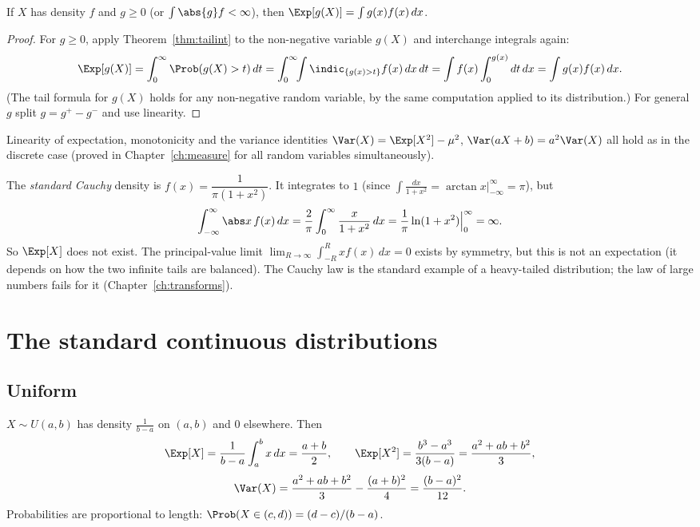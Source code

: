 \begin{theorem}\label{thm:lotuscont}
If $X$ has density $f$ and $g\ge0$ (or $\int\abs{g}f<\infty$), then
$\Exp[g(X)]=\int g(x)f(x)\,dx$.
\end{theorem}
\begin{proof}
For $g\ge0$, apply Theorem~\ref{thm:tailint} to the non-negative variable
$g(X)$ and interchange integrals again:
\[
\Exp[g(X)]=\int_0^\infty\Prob(g(X)>t)\,dt=\int_0^\infty\!\!\int\indic_{\{g(x)>t\}}f(x)\,dx\,dt
=\int f(x)\int_0^{g(x)}dt\,dx=\int g(x)f(x)\,dx.
\]
(The tail formula for $g(X)$ holds for any non-negative random variable, by the
same computation applied to its distribution.) For general $g$ split
$g=g^+-g^-$ and use linearity.
\end{proof}

Linearity of expectation, monotonicity and the variance identities
$\Var(X)=\Exp[X^2]-\mu^2$, $\Var(aX+b)=a^2\Var(X)$ all hold as in the discrete case
(proved in Chapter~\ref{ch:measure} for all random variables simultaneously).

\begin{example}\label{ex:cauchy}
The \emph{standard Cauchy} density is $f(x)=\dfrac1{\pi(1+x^2)}$. It integrates to
$1$ (since $\int\frac{dx}{1+x^2}=\arctan x\big|_{-\infty}^\infty=\pi$), but
\[
\int_{-\infty}^\infty\abs x\,f(x)\,dx=\frac2\pi\int_0^\infty\frac x{1+x^2}\,dx
=\frac1\pi\ln(1+x^2)\Big|_0^\infty=\infty .
\]
So $\Exp[X]$ does not exist. The principal-value limit
$\lim_{R\to\infty}\int_{-R}^{R}xf(x)\,dx=0$ exists by symmetry, but this is not an
expectation (it depends on how the two infinite tails are balanced). The Cauchy
law is the standard example of a heavy-tailed distribution; the law of large
numbers fails for it (Chapter~\ref{ch:transforms}).
\end{example}

\section{The standard continuous distributions}

\subsection{Uniform}

$X\sim U(a,b)$ has density $\frac1{b-a}$ on $(a,b)$ and $0$ elsewhere. Then
\[
\Exp[X]=\frac1{b-a}\int_a^bx\,dx=\frac{a+b}2,\qquad
\Exp[X^2]=\frac{b^3-a^3}{3(b-a)}=\frac{a^2+ab+b^2}3,
\]
\[
\Var(X)=\frac{a^2+ab+b^2}3-\frac{(a+b)^2}4=\frac{(b-a)^2}{12}.
\]
Probabilities are proportional to length: $\Prob(X\in(c,d))=(d-c)/(b-a)$.

